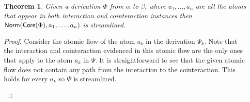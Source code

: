 \documentclass[a4paper]{amsart}
\newtheorem{thm}{Theorem}[section]
\theoremstyle{remark}
\theoremstyle{definition}
\begin{document}
\begin{thm}
Given a derivation $\Phi$ from $\alpha$ to $\beta$, where $a_1,\dots,a_n$ are all the atoms that appear in both interaction and cointeraction instances then $\mathsf{Norm}(\mathsf{Core}(\Phi),a_1,\dots,a_n)$ is streamlined.
\end{thm}
\begin{proof}

Consider the atomic flow of the atom $a_k$ in the derivation $\Psi_k$. Note that the interaction and cointeraction evidenced in this atomic flow are the only ones that apply to the atom $a_k$ in $\Psi$. It is straightforward to see that the given atomic flow does not contain any path from the interaction to the cointeraction. This holds for every $a_k$ so $\Psi$ is streamlined.

\begin{center}
\end{center}

\end{proof}



%
% 
% 
\end{document}
